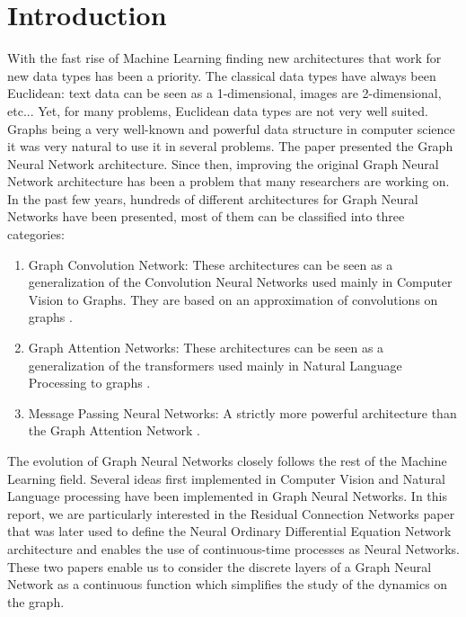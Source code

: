 \documentclass[12pt]{article}
\begin{document}
\newpage
\section{Introduction}

With the fast rise of Machine Learning finding new architectures that work for new data types has been a priority. The classical data types have always been Euclidean: text data can be seen as a 1-dimensional, images are 2-dimensional, etc... Yet, for many problems, Euclidean data types are not very well suited. Graphs being a very well-known and powerful data structure in computer science it was very natural to use it in several problems. The paper  presented the Graph Neural Network architecture. Since then, improving the original Graph Neural Network architecture has been a problem that many researchers are working on.\\

In the past few years, hundreds of different architectures for Graph Neural Networks have been presented, most of them can be classified into three categories:
\begin{enumerate}
    \item Graph Convolution Network: These architectures can be seen as a generalization of the Convolution Neural Networks used mainly in Computer Vision to Graphs. They are based on an approximation of  convolutions on graphs .

    \item Graph Attention Networks: These architectures can be seen as a generalization of the transformers used mainly in Natural Language Processing to graphs .

    \item Message Passing Neural Networks: A strictly more powerful architecture than the Graph Attention Network .
\end{enumerate}

The evolution of Graph Neural Networks closely follows the rest of the Machine Learning field. Several ideas first implemented in Computer Vision and Natural Language processing have been implemented in Graph Neural Networks. In this report, we are particularly interested in the Residual Connection Networks paper  that was later used to define the Neural Ordinary Differential Equation Network architecture  and enables the use of continuous-time processes as Neural Networks. These two papers enable us to consider the discrete layers of a Graph Neural Network as a continuous function which simplifies the study of the dynamics on the graph.
\end{document}

